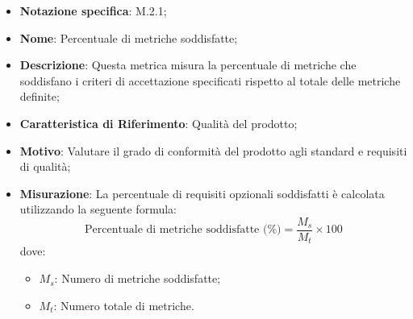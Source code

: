 \begin{itemize}
    \item \textbf{Notazione specifica}: M.2.1;
    \item \textbf{Nome}: Percentuale di metriche soddisfatte;
    \item \textbf{Descrizione}: Questa metrica misura la percentuale di metriche che soddisfano i criteri di accettazione specificati rispetto al totale delle metriche definite;
    \item \textbf{Caratteristica di Riferimento}: Qualità del prodotto;
    \item \textbf{Motivo}: Valutare il grado di conformità del prodotto agli standard e requisiti di qualità;
    \item \textbf{Misurazione}: La percentuale di requisiti opzionali soddisfatti è calcolata utilizzando la seguente formula:
    \[
        \text{Percentuale di metriche soddisfatte (\%)} =\frac{M_{s}}{M_{t}} \times 100 
    \]
    dove:
    \begin{itemize}
        \item $M_{s}$: Numero di metriche soddisfatte;
        \item $M_{t}$: Numero totale di metriche.
    \end{itemize}
    
\end{itemize}
